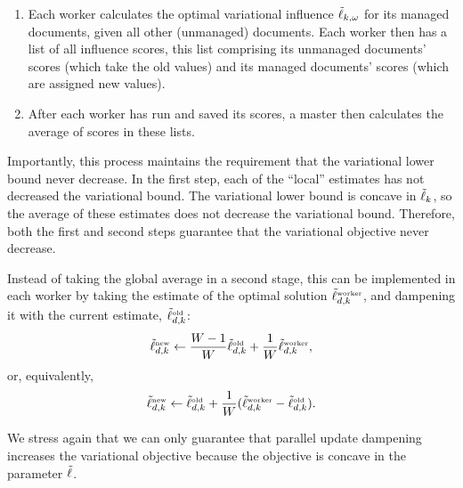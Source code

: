 \begin{enumerate}
\item Each worker calculates the optimal variational influence
  $\tilde{\ell}_{k,\omega}$ for its managed documents, given all other
  (unmanaged) documents.  Each worker then has a list of all influence
  scores, this list comprising its unmanaged documents' scores (which take the
  old values) and its managed documents' scores (which are assigned new
  values).
  
\item After each worker has run and saved its scores, a master then
  calculates the average of scores in these lists.
\end{enumerate}
Importantly, this process maintains the requirement that the
variational lower bound never decrease.  In the first step, each of
the ``local'' estimates has not decreased the variational bound.  The
variational lower bound is concave in $\tilde{\ell}_{k}$, so the average of
these estimates does not decrease the variational bound.  Therefore,
both the first and second steps guarantee that the variational
objective never decrease.

Instead of taking the global average in a second stage, this can be
implemented in each worker by taking the estimate of the optimal
solution $\tilde{\ell}^{\mbox{\tiny worker}}_{d,k}$, and dampening it with
the current estimate, $\tilde{\ell}^{\mbox{\tiny old}}_{d,k}$:
 \[
  \tilde{\ell}^{\mbox{\tiny new}}_{d,k} \gets \frac{W - 1}{W} \tilde{\ell}^{\mbox{\tiny old}}_{d,k} + \frac{1}{W} \tilde{\ell}^{\mbox{\tiny worker}}_{d,k},
\]
or, equivalently,
 \[
 \tilde{\ell}^{\mbox{\tiny new}}_{d,k} \gets \tilde{\ell}^{\mbox{\tiny old}}_{d,k} + \frac{1}{W} (\tilde{\ell}^{\mbox{\tiny worker}}_{d,k} - \tilde{\ell}^{\mbox{\tiny old}}_{d,k}).
\]

We stress again that we can only guarantee that parallel update
dampening increases the variational objective because the objective is
concave in the parameter $\tilde{\ell}$.
